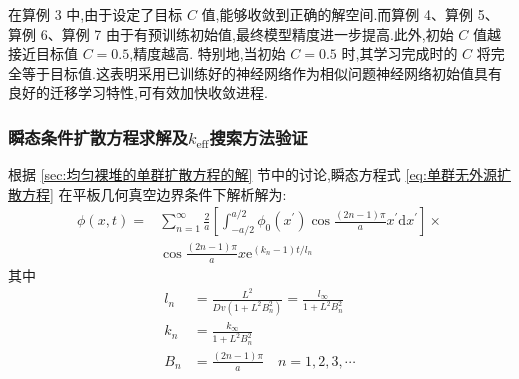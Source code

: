 \documentclass{Sichuan Normal University}
\begin{document}
在算例 3 中,由于设定了目标 $C$ 值,能够收敛到正确的解空间.而算例 4、算例 5、算例 6、算例 7 由于有预训练初始值,最终模型精度进一步提高.此外,初始 $C$ 值越接近目标值 $C=0.5$,精度越高.
特别地,当初始 $C=0.5$ 时,其学习完成时的 $C$ 将完全等于目标值.这表明采用已训练好的神经网络作为相似问题神经网络初始值具有良好的迁移学习特性,可有效加快收敛进程.

\subsubsection{瞬态条件扩散方程求解及$k_{\text{eff}}$搜索方法验证}

根据 \ref{sec:均匀裸堆的单群扩散方程的解} 节中的讨论,瞬态方程式 \ref{eq:单群无外源扩散方程} 在平板几何真空边界条件下解析解为:
\begin{equation}
\begin{aligned}
\phi(x, t)= & \sum_{n=1}^{\infty} \frac{2}{a}\left[\int_{-a / 2}^{a / 2} \phi_0\left(x^{\prime}\right) \cos \frac{(2 n-1) \pi}{a} x^{\prime} \mathrm{d} x^{\prime}\right] \times \\
& \cos \frac{(2 n-1) \pi}{a} x \mathrm{e}^{\left(k_n-1\right) t / l_n}
\end{aligned}\label{eq:瞬态扩散方程解析解10}
\end{equation}
其中
\begin{align}
l_n&=\frac{L^2}{Dv\left(1+L^2 B_n^2\right)}=\frac{l_{\infty}}{1+L^2 B_n^2}\\
k_n&=\frac{k_{\infty}}{1+L^2 B_n^2}\\
B_n&=\frac{(2 n-1) \pi}{a} \quad n=1,2,3, \cdots
\end{align}
\end{document}
